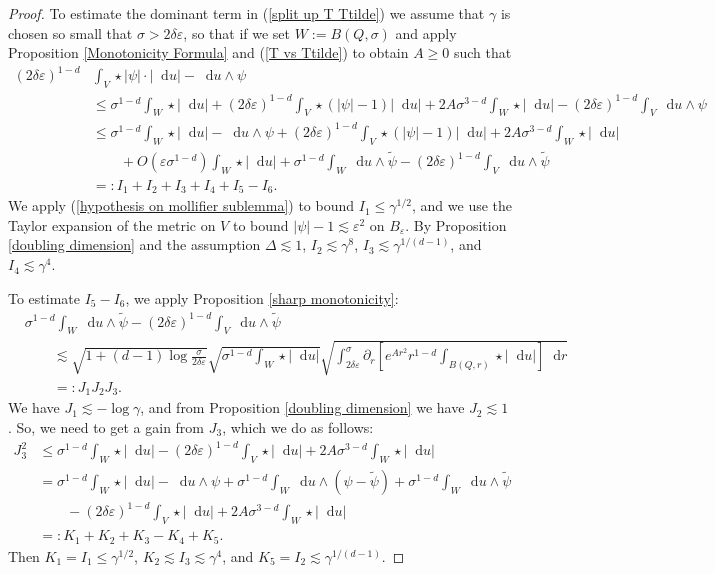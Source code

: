 \documentclass[reqno,12pt,letterpaper]{amsart}
\newcommand*\dif{\mathop{}\!\mathrm{d}}
\theoremstyle{definition}
\numberwithin{equation}{section}
\begin{document}
\begin{proof}
To estimate the dominant term in (\ref{split up T Ttilde}) we assume that $\gamma$ is chosen so small that $\sigma > 2\delta\varepsilon$, so that if we set $W := B(Q, \sigma)$ and apply Proposition \ref{Monotonicity Formula} and (\ref{T vs Ttilde}) to obtain $A \geq 0$ such that
\begin{align*}
(2\delta\varepsilon)^{1 - d} &\int_V \star |\psi| \cdot |\dif u| - \dif u \wedge \psi \\
&\leq \sigma^{1 - d}\int_W \star |\dif u| + (2\delta\varepsilon)^{1 - d} \int_V \star(|\psi| - 1)|\dif u| + 2A\sigma^{3 - d} \int_W \star |\dif u| - (2\delta\varepsilon)^{1 - d}\int_V \dif u \wedge \psi\\
&\leq \sigma^{1 - d}\int_W \star |\dif u| - \dif u \wedge \psi + (2\delta\varepsilon)^{1 - d} \int_V \star(|\psi| - 1)|\dif u| + 2A\sigma^{3 - d} \int_W \star |\dif u| \\
&\qquad + O(\varepsilon \sigma^{1 - d}) \int_W \star |\dif u| + \sigma^{1 - d}\int_W \dif u \wedge \tilde \psi - (2\delta\varepsilon)^{1 - d}\int_V \dif u \wedge \tilde \psi\\
&=: I_1 + I_2 + I_3 + I_4 + I_5 - I_6.
\end{align*}
We apply (\ref{hypothesis on mollifier sublemma}) to bound $I_1 \leq \gamma^{1/2}$, and we use the Taylor expansion of the metric on $V$ to bound $|\psi| - 1 \lesssim \varepsilon^2$ on $B_\varepsilon$.
By Proposition \ref{doubling dimension} and the assumption $\Delta \lesssim 1$, $I_2 \lesssim \gamma^8$, $I_3 \lesssim \gamma^{1/(d - 1)}$, and $I_4 \lesssim \gamma^4$.

To estimate $I_5 - I_6$, we apply Proposition \ref{sharp monotonicity}:
\begin{align*}
&\sigma^{1 - d} \int_W \dif u \wedge \tilde \psi - (2\delta\varepsilon)^{1 - d} \int_V \dif u \wedge \tilde \psi \\
&\qquad \lesssim \sqrt{1 + (d - 1) \log \frac{\sigma}{2\delta\varepsilon}} \sqrt{\sigma^{1 - d} \int_W \star |\dif u|} \sqrt{\int_{2\delta\varepsilon}^\sigma \partial_r \left[e^{Ar^2} r^{1 - d} \int_{B(Q, r)} \star |\dif u|\right] \dif r}\\
&\qquad =: J_1 J_2 J_3.
\end{align*}
We have $J_1 \lesssim -\log \gamma$, and from Proposition \ref{doubling dimension} we have $J_2 \lesssim 1$.
So, we need to get a gain from $J_3$, which we do as follows:
\begin{align*}
J_3^2 &\leq \sigma^{1 - d} \int_W \star |\dif u| - (2 \delta \varepsilon)^{1 - d} \int_V \star |\dif u| + 2A\sigma^{3 - d} \int_W \star |\dif u| \\
&= \sigma^{1 - d} \int_W \star |\dif u| - \dif u \wedge \psi + \sigma^{1 - d} \int_W \dif u \wedge (\psi - \tilde \psi) + \sigma^{1 - d} \int_W \dif u \wedge \tilde \psi \\
&\qquad - (2 \delta\varepsilon)^{1 - d} \int_V \star |\dif u| + 2A \sigma^{3 - d} \int_W \star |\dif u| \\
&=: K_1 + K_2 + K_3 - K_4 + K_5.
\end{align*}
Then $K_1 = I_1 \leq \gamma^{1/2}$, $K_2 \lesssim I_3 \lesssim \gamma^4$, and $K_5 = I_2 \lesssim \gamma^{1/(d - 1)}$.


\end{proof}
\end{document}
